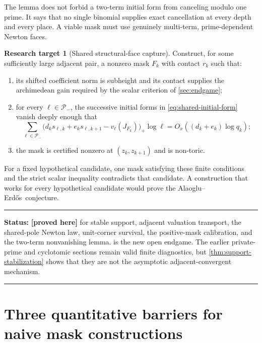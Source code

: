 \documentclass[11pt,oneside]{article}
\theoremstyle{definition}
\newtheorem{target}[theorem]{Research target}
\theoremstyle{remark}
\newcommand{\AEname}{Alaoglu--Erd\H{o}s}
\newcommand{\statusproved}{\textcolor{provedgreen}{\textbf{[proved here]}}}
\newenvironment{statusbox}[1]
{\begin{center}\begin{minipage}{0.94\textwidth}\raggedright\hrule\vspace{0.45em}
\textbf{Status:} #1\par\vspace{0.35em}}
{\vspace{0.35em}\hrule\end{minipage}\end{center}}
\begin{document}
The lemma does not forbid a two-term initial form from canceling modulo one prime.  It says
that no single binomial supplies exact cancellation at every depth and every place.  A viable
mask must use genuinely multi-term, prime-dependent Newton faces.

\begin{target}[Shared structural-face capture]
\label{target:shared-face-capture}
Construct, for some sufficiently large adjacent pair, a nonzero mask $F_k$ with contact
$r_k$ such that:
\begin{enumerate}
\item its shifted coefficient norm is subheight and its contact supplies the archimedean gain
  required by the scalar criterion of \cref{sec:endgame};
\item for every $\ell\in\mathcal P_-$, the successive initial forms in
  \eqref{eq:shared-initial-form} vanish deeply enough that
  \begin{equation}
   \sum_{\ell\in\mathcal P_-}
   \bigl(d_ks_{\ell,k}+e_ks_{\ell,k+1}-v_\ell(J_{F_k})\bigr)_+\log\ell
   =O_x((d_k+e_k)\log q_k);
   \label{eq:full-shared-face-capture}
  \end{equation}
\item the mask is certified nonzero at $(z_k,z_{k+1})$ and is non-toric.
\end{enumerate}
For a fixed hypothetical candidate, one mask satisfying these finite conditions and the
strict scalar inequality contradicts that candidate.  A construction that works for every
hypothetical candidate would prove the \AEname\ conjecture.
\end{target}

\begin{statusbox}{\statusproved{} for stable support, adjacent valuation transport, the
shared-pole Newton law, unit-corner survival, the positive-mask calibration, and the two-term
nonvanishing lemma.  \Cref{target:shared-face-capture} is the new open endgame.  The earlier
private-prime and cyclotomic sections remain valid finite diagnostics, but
\cref{thm:support-stabilization} shows that they are not the asymptotic adjacent-convergent
mechanism.}
\end{statusbox}

\section{Three quantitative barriers for naive mask constructions}
\label{sec:quantitative-barriers}
\end{document}
